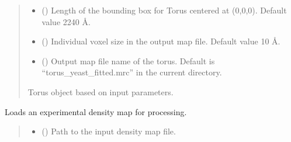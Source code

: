 \documentclass[letterpaper,10pt,english]{sphinxmanual}
\begin{document}
\begin{fulllineitems}
\begin{fulllineitems}
\begin{quote}
\begin{description}
\begin{itemize}
\item {} 
\sphinxAtStartPar
{} (\sphinxstyleliteralemphasis{\sphinxupquote{, }}) \textendash{} Length of the bounding box for Torus centered at (0,0,0). Default value 2240 Å.

\item {} 
\sphinxAtStartPar
{} (\sphinxstyleliteralemphasis{\sphinxupquote{, }}) \textendash{} Individual voxel size in the output map file. Default value 10 Å.

\item {} 
\sphinxAtStartPar
{} (\sphinxstyleliteralemphasis{\sphinxupquote{, }}) \textendash{} Output map file name of the torus. Default is “torus\_yeast\_fitted.mrc” in the current directory.

\end{itemize}

\sphinxAtStartPar
Torus object based on input parameters.

\sphinxAtStartPar
{\hyperref[\detokenize{src:src.Torus.Torus}]{}}

\end{description}\end{quote}

\end{fulllineitems}


\begin{fulllineitems}
\label{\detokenize{src:src.BagelFitter.BagelFitter.load_exprimental_map}}
\pysigstartsignatures
{}
\pysigstopsignatures
\sphinxAtStartPar
Loads an experimental density map for processing.
\begin{quote}\begin{description}
\begin{itemize}
\item {} 
\sphinxAtStartPar
{} () \textendash{} Path to the input density map file.


\end{itemize}
\end{description}
\end{quote}
\end{fulllineitems}
\end{fulllineitems}
\end{document}
